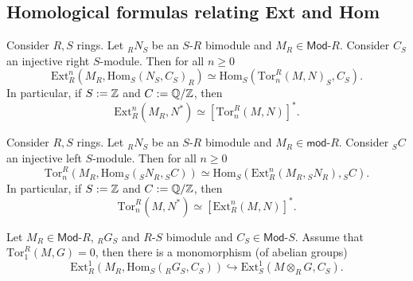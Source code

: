 \subsection{Homological formulas relating Ext and Hom}
\begin{prop}
	Consider $R,S$ rings.
	Let ${}_RN_S$ be an $S$-$R$ bimodule and $M_R \in \mathsf{Mod}\text{-}R$.
	Consider $C_S$ an injective right $S$-module.
	Then for all $n \geq 0$
	\begin{equation}
	\mathrm{Ext}^{ n}_{ R} \left( M_R, \mathrm{Hom}_{ S}\left( N_S, C_S \right)_R \right) \simeq
	\mathrm{Hom}_{ S}\left( \mathrm{Tor}^{ R}_{ n} \left( M, N \right)_S, C_S  \right)
	.\end{equation} 
	In particular, if $S := \mathbb{Z}$ and $C := \mathbb{Q}/\mathbb{Z}$, then
	\begin{equation}
	\mathrm{Ext}^{ n}_{ R} \left( M_R, N^* \right) \simeq
	\left[ \mathrm{Tor}^{ R}_{ n} \left( M, N \right)\right]^*
	.\end{equation} 
\end{prop} 

\begin{prop}
	Consider $R,S$ rings.
	Let ${}_RN_S$ be an $S$-$R$ bimodule and $M_R \in \mathsf{mod}\text{-}R$.
	Consider ${}_SC$ an injective left $S$-module.
	Then for all $n \geq 0$
	\begin{equation}
		\mathrm{Tor}^{ R}_{ n} \left( M_R, \mathrm{Hom}_{ S}\left( {}_SN_R, {}_SC \right) \right) \simeq
		\mathrm{Hom}_{ S}\left( \mathrm{Ext}^{ n}_{ R} \left( M_R, {}_SN_R \right), {}_SC \right)
	.\end{equation} 
	In particular, if $S := \mathbb{Z}$ and $C := \mathbb{Q}/\mathbb{Z}$, then
	\begin{equation}
		\mathrm{Tor}^{ R}_{ n} \left( M, N^* \right) \simeq
		\left[ \mathrm{Ext}^{ n}_{ R} \left( M, N \right) \right]^*
	.\end{equation} 
\end{prop} 

\begin{ex}
	Let $M_R \in \mathsf{Mod}\text{-}R$,
	${}_RG_S$ and $R$-$S$ bimodule and $C_S \in \mathsf{Mod}\text{-}S$.
	Assume that $\mathrm{Tor}^{ R}_{ 1} \left( M, G \right) = 0$, then
	there is a monomorphism (of abelian groups)
	\begin{equation}
		\mathrm{Ext}^{ 1}_{ R} \left( M_R, \mathrm{Hom}_{ S}\left( {}_RG_S, C_S \right) \right) \hookrightarrow 
		\mathrm{Ext}^{ 1}_{ S} \left( M \otimes_R G, C_S \right)
	.\end{equation}
\end{ex} 

